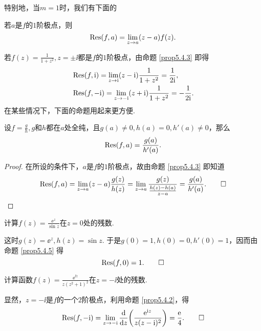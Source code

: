 特别地，当$m=1$时，我们有下面的
\begin{prop}\label{prop5.4.3}
  若$a$是$f$的$1$阶极点，则
  \[
    \operatorname*{Res}(f,a) = \lim_{z\to a}(z-a)f(z).
  \]
\end{prop}

\begin{example}\label{exam5.4.4}
  若$f(z)=\frac1{1+z^2},z=\pm\ii$都是$f$的$1$阶极点，由命题 \ref{prop5.4.3} 即得
  \begin{align*}
    & \operatorname*{Res}(f,\mathrm i) = \lim_{z\to \mathrm i}(z-\mathrm i)\frac1{1+z^2} = \frac1{2\mathrm i},\\
    & \operatorname*{Res}(f,-\mathrm i) = \lim_{z\to-\mathrm i}(z+\mathrm i)\frac1{1+z^2} = -\frac1{2\mathrm i}.
  \end{align*}
  在某些情况下，下面的命题用起来更方便.
\end{example}

\begin{prop}\label{prop5.4.5}
  设$f=\frac gh,g$和$h$都在$a$处全纯，且$g(a)\ne0,h(a)=0,h'(a)\ne0$，那么
  \[
    \operatorname*{Res}(f,a) = \frac{g(a)}{h'(a)}.
  \]
\end{prop}
\begin{proof}
  在所设的条件下，$a$是$f$的$1$阶极点，故由命题 \ref{prop5.4.3} 即知道
  \begin{equation*}
    \operatorname*{Res}(f,a) = \lim_{z\to a}(z-a)\frac{g(z)}{h(z)}
    = \lim_{z\to a}\frac{g(z)}{\frac{h(z)-h(a)}{z-a}} = \frac{g(a)}{h'(a)}. \qedhere
  \end{equation*}
\end{proof}

\begin{example}\label{exam5.4.6}
  计算$f(z)=\frac{\ee^z}{\sin z}$在$z=0$处的残数.
\end{example}
\begin{solution}
  这时$g(z)=\ee^z,h(z)=\sin z$. 于是$g(0)=1,h(0)=0,h'(0)=1$，因而由命题 \ref{prop5.4.5} 得
  \begin{equation*}
    \operatorname*{Res}(f,0) = 1. \qedhere
  \end{equation*}
\end{solution}

\begin{example}
  计算函数$f(z)=\frac{\ee^{\ii z}}{z(z^2+1)^2}$在$z=-\ii$处的残数.
\end{example}
\begin{solution}
  显然，$z=-\ii$是$f$的一个$2$阶极点，利用命题 \ref{prop5.4.2}，得
  \begin{equation*}
    \operatorname*{Res}(f,-\mathrm i) = \lim_{z\to-\mathrm i}\frac{\mathop{}\!\mathrm d}{\mathop{}\!\mathrm dz}\bigg(\frac{\operatorname{\!\!\;\mathrm e}^{\mathrm i z}}{z(z-\mathrm i)^2}\bigg)
    = \frac{\operatorname{\!\!\;\mathrm e}}4. \qedhere
  \end{equation*}
\end{solution}

